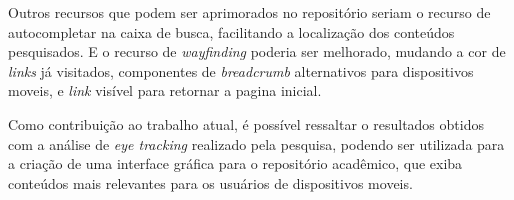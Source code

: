 Outros recursos que podem ser aprimorados no repositório seriam
o recurso de autocompletar na caixa de busca, facilitando a localização
dos conteúdos pesquisados. E o recurso de \emph{wayfinding} poderia ser
melhorado, mudando a cor de \emph{links} já visitados, componentes
de \emph{breadcrumb} alternativos para dispositivos moveis, e
\emph{link} visível para retornar a pagina inicial.

Como contribuição ao trabalho atual, é possível ressaltar o resultados
obtidos com a análise de \emph{eye tracking} realizado pela pesquisa,
podendo ser utilizada para a criação de uma interface gráfica para
o repositório acadêmico, que exiba conteúdos mais relevantes para
os usuários de dispositivos moveis.

\pagebreak

\begin{landscape}
    \begin{table}[H]
        \captionsetup{justification=centering}
        \caption{Trabalhos Relacionados}
        \centering
\end{table}
\end{landscape}
